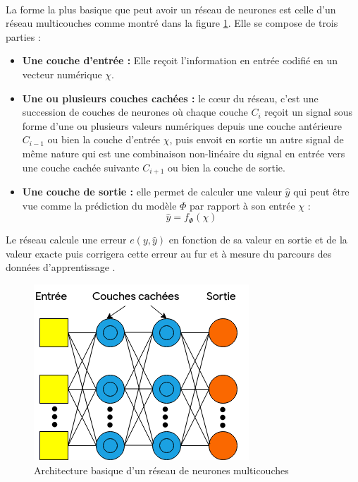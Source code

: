 \paragraph{}
La forme la plus basique que peut avoir un réseau de neurones est celle d'un réseau multicouches comme montré dans la figure \ref{mlp}. Elle se compose de trois parties :
\begin{itemize}
	\item \textbf{Une couche d'entrée :} Elle reçoit l'information en entrée codifié en un vecteur numérique $\chi$.
	
	\item  \textbf{Une ou plusieurs couches cachées :} le c\oe{}ur du réseau, c'est une succession de couches de neurones où chaque couche $C_i$ reçoit un signal sous forme d'une ou plusieurs valeurs numériques depuis une couche antérieure $C_{i-1}$ ou bien la couche d'entrée $\chi$, puis envoit en sortie un autre signal de même nature qui est une combinaison non-linéaire du signal en entrée vers une couche cachée suivante $C_{i+1}$ ou bien la couche de sortie.
	
	\item \textbf{Une couche de sortie :}
	elle permet de calculer une valeur $\hat{y}$ qui peut être vue comme la prédiction du modèle $\Phi$ par rapport à son entrée $\chi$ : 
	\begin{equation}
	\hat{y} = f_\Phi(\chi)
	\end{equation}
\end{itemize}
Le réseau calcule une erreur $e(y,\hat{y})$ en fonction de sa valeur en sortie et de la valeur exacte puis corrigera cette erreur au fur et à mesure du parcours des données d'apprentissage \citep{mlp}.
\begin{figure}[H]
	\centering
	\includegraphics[width=0.5\linewidth]{images/notions/mlp.png}
	\caption{Architecture basique d'un réseau de neurones multicouches}
	\label{mlp}
\end{figure}

